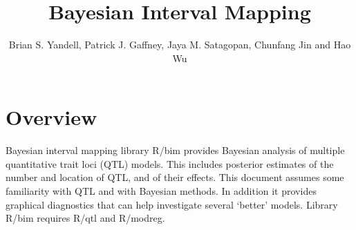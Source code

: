 \documentclass{article}
\begin{document}
\title{Bayesian Interval Mapping}
\author{Brian S. Yandell, Patrick J. Gaffney, Jaya M. Satagopan, Chunfang Jin and Hao Wu} 
\maketitle

\section{Overview}
Bayesian interval mapping library R/bim provides Bayesian analysis of
multiple quantitative trait loci (QTL) models. This includes posterior
estimates of the number and location of QTL, and of their
effects. This document assumes some familiarity with QTL and with
Bayesian methods. In
addition it provides graphical diagnostics that can help investigate
several `better' models. Library R/bim requires R/qtl and R/modreg.
\end{document}
